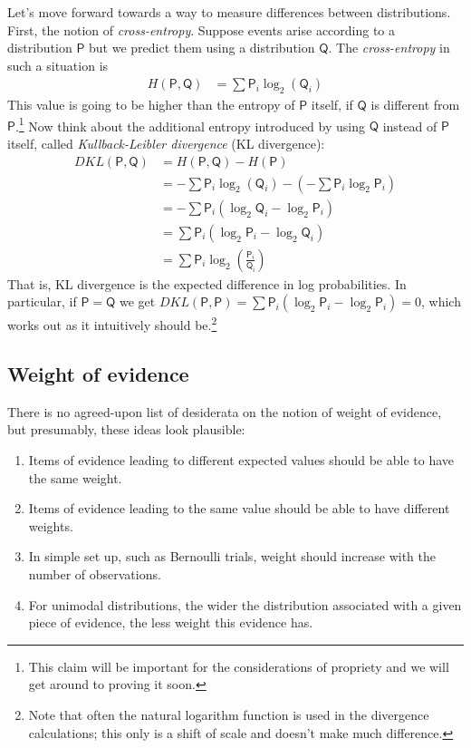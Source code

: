 \documentclass[
  10pt,
  dvipsnames,enabledeprecatedfontcommands]{scrartcl}
\begin{document}
Let's move forward towards a way to measure differences between
distributions. First, the notion of \emph{cross-entropy}. Suppose events
arise according to a distribution \(\mathsf{P}\) but we predict them
using a distribution \(\mathsf{Q}\). The \emph{cross-entropy} in such a
situation is \begin{align*}
H(\mathsf{P}, \mathsf{Q}) & = \sum \mathsf{P}_i \log_2(\mathsf{Q}_i)
\end{align*} This value is going to be higher than the entropy of
\(\mathsf{P}\) itself, if \(\mathsf{Q}\) is different from
\(\mathsf{P}\).\footnote{This claim will be important for the considerations of propriety and we will get around to proving it soon.}
Now think about the additional entropy introduced by using
\(\mathsf{Q}\) instead of \(\mathsf{P}\) itself, called
\emph{Kullback-Leibler divergence} (KL divergence): \begin{align*}
DKL(\mathsf{P}, \mathsf{Q}) & = H(\mathsf{P}, \mathsf{Q}) - H(\mathsf{P})\\
&= - \sum \mathsf{P}_i \log_2(\mathsf{Q}_i)  - \left(   - \sum \mathsf{P}_i \log_2 \mathsf{P}_i\right) \\
& = - \sum \mathsf{P}_i\left( \log_2 \mathsf{Q}_i - \log_2\mathsf{P}_i\right)\\
& =  \sum \mathsf{P}_i\left( \log_2 \mathsf{P}_i - \log_2\mathsf{Q}_i\right)\\
& = \sum \mathsf{P}_i \log_2 \left( \frac{\mathsf{P}_i}{\mathsf{Q_i}}\right)
\end{align*} \noindent  That is, KL divergence is the expected
difference in log probabilities. In particular, if
\(\mathsf{P}=\mathsf{Q}\) we get
\(DKL(\mathsf{P},\mathsf{P}) = \sum \mathsf{P}_i (\log_2 \mathsf{P}_i - \log_2 \mathsf{P}_i) = 0\),
which works out as it intuitively should
be.\footnote{Note that often the natural logarithm function is used in the divergence calculations; this only is a shift of scale and doesn't make much difference.}

\hypertarget{weight-of-evidence}{%
\subsection{Weight of evidence}\label{weight-of-evidence}}

There is no agreed-upon list of desiderata on the notion of weight of
evidence, but presumably, these ideas look plausible:

\begin{enumerate}
\item Items of evidence leading to different expected values should be able to have the same weight.
\item Items of evidence leading to the same value should be able to have different weights.
\item In simple set up, such as Bernoulli trials, weight should increase with the number of observations.
\item For unimodal distributions, the wider the distribution associated with a given piece of evidence, the less weight this evidence has.
\end{enumerate}
\end{document}
